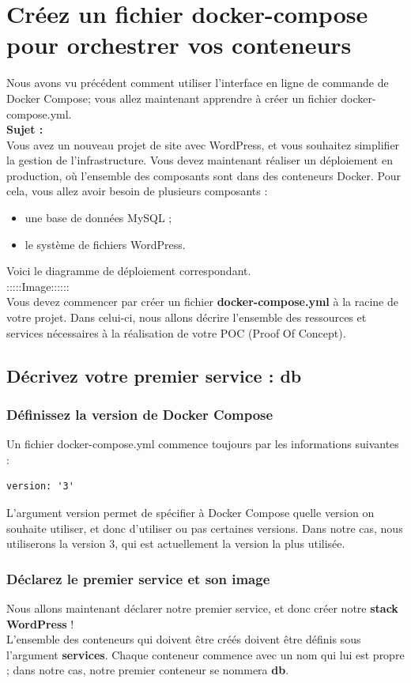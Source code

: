 \documentclass[12pt,a4paper]{article}
\begin{document}
\section{Créez un fichier docker-compose pour orchestrer vos conteneurs}
Nous avons vu précédent comment utiliser l'interface en ligne de commande de Docker Compose; vous allez maintenant apprendre à créer un fichier docker-compose.yml. \\
\textbf{Sujet :} \\
Vous avez un nouveau projet de site avec WordPress, et vous souhaitez simplifier la gestion de l'infrastructure. Vous devez maintenant réaliser un déploiement en production, où l'ensemble des composants sont dans des conteneurs Docker. Pour cela, vous allez avoir besoin de plusieurs composants :
\begin{itemize}
\item une base de données MySQL ;
\item le système de fichiers WordPress.
\end{itemize}
Voici le diagramme de déploiement correspondant.\\
:::::Image::::::\\

Vous devez commencer par créer un fichier \textbf{docker-compose.yml} à la racine de votre projet. Dans celui-ci, nous allons décrire l'ensemble des ressources et services nécessaires à la réalisation de votre POC (Proof Of Concept).\\
\subsection{Décrivez votre premier service : db}
\subsubsection{Définissez la version de Docker Compose}
Un fichier docker-compose.yml commence toujours par les informations suivantes :
\begin{verbatim}
version: '3'
\end{verbatim}
L'argument version permet de spécifier à Docker Compose quelle version on souhaite utiliser, et donc d'utiliser ou pas certaines versions. Dans notre cas, nous utiliserons la version 3, qui est actuellement la version la plus utilisée.\\

\subsubsection{Déclarez le premier service et son image}
Nous allons maintenant déclarer notre premier service, et donc créer notre \textbf{stack WordPress} !\\
L'ensemble des conteneurs qui doivent être créés doivent être définis sous l'argument \textbf{services}. Chaque conteneur commence avec un nom qui lui est propre ; dans notre cas, notre premier conteneur se nommera \textbf{db}.
\end{document}

